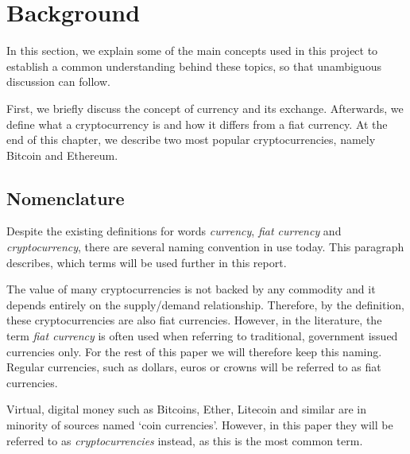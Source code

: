 \section{Background}\label{sec:background}
% 
In this section, we explain some of the main concepts used in this project to establish a common understanding behind these topics, so that unambiguous discussion can follow.

First, we briefly discuss the concept of currency and its exchange. Afterwards, we define what a cryptocurrency is and how it differs from a fiat currency. At the end of this chapter, we describe two most popular cryptocurrencies, namely Bitcoin and Ethereum.
% 

% 

% 

% 

% 


\subsection{Nomenclature}
Despite the existing definitions for words \textit{currency}, \textit{fiat currency} and \textit{cryptocurrency}, there are several naming convention in use today. This paragraph describes, which terms will be used further in this report.

The value of many cryptocurrencies is not backed by any commodity and it depends entirely on the supply/demand relationship. Therefore, by the definition, these cryptocurrencies are also fiat currencies. However, in the literature, the term \emph{fiat currency} is often used when referring to traditional, government issued currencies only. For the rest of this paper we will therefore keep this naming. Regular currencies, such as dollars, euros or crowns will be referred to as fiat currencies.

Virtual, digital money such as Bitcoins, Ether, Litecoin and similar are in minority of sources named `coin currencies'. However, in this paper they will be referred to as \textit{cryptocurrencies} instead, as this is the most common term.